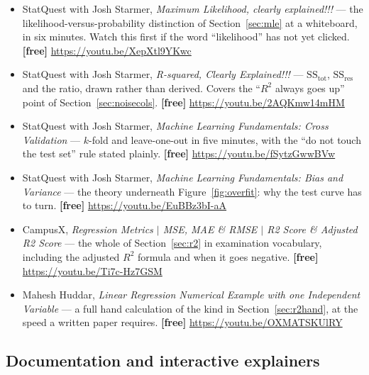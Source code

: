 \documentclass[11pt]{article}
\begin{document}
\begin{itemize}[leftmargin=*]
  \item StatQuest with Josh Starmer, \emph{Maximum Likelihood, clearly
    explained!!!} --- the likelihood-versus-probability distinction of
    Section~\ref{sec:mle} at a whiteboard, in six minutes. Watch this first if
    the word ``likelihood'' has not yet clicked. \textbf{[free]}
    \url{https://youtu.be/XepXtl9YKwc}
  \item StatQuest with Josh Starmer, \emph{R-squared, Clearly Explained!!!} ---
    $\mathrm{SS_{tot}}$, $\mathrm{SS_{res}}$ and the ratio, drawn rather than
    derived. Covers the ``$R^2$ always goes up'' point of
    Section~\ref{sec:noisecols}. \textbf{[free]}
    \url{https://youtu.be/2AQKmw14mHM}
  \item StatQuest with Josh Starmer, \emph{Machine Learning Fundamentals:
    Cross Validation} --- $k$-fold and leave-one-out in five minutes, with the
    ``do not touch the test set'' rule stated plainly. \textbf{[free]}
    \url{https://youtu.be/fSytzGwwBVw}
  \item StatQuest with Josh Starmer, \emph{Machine Learning Fundamentals: Bias
    and Variance} --- the theory underneath Figure~\ref{fig:overfit}: why the
    test curve has to turn. \textbf{[free]}
    \url{https://youtu.be/EuBBz3bI-aA}
  \item CampusX, \emph{Regression Metrics $\vert$ MSE, MAE \& RMSE $\vert$ R2
    Score \& Adjusted R2 Score} --- the whole of Section~\ref{sec:r2} in
    examination vocabulary, including the adjusted $R^2$ formula and when it
    goes negative. \textbf{[free]}
    \url{https://youtu.be/Ti7c-Hz7GSM}
  \item Mahesh Huddar, \emph{Linear Regression Numerical Example with one
    Independent Variable} --- a full hand calculation of the kind in
    Section~\ref{sec:r2hand}, at the speed a written paper requires.
    \textbf{[free]} \url{https://youtu.be/OXMATSKUlRY}
\end{itemize}

\subsection*{Documentation and interactive explainers}
\end{document}

